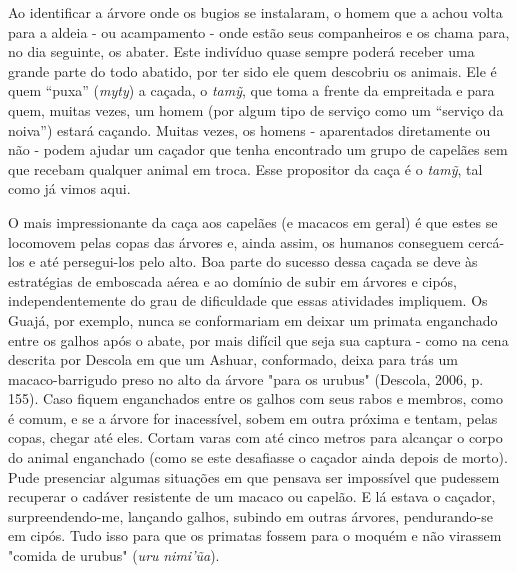 Ao identificar a árvore onde os bugios se instalaram, o homem que a
achou volta para a aldeia - ou acampamento - onde estão seus
companheiros e os chama para, no dia seguinte, os abater. Este indivíduo
quase sempre poderá receber uma grande parte do todo abatido, por ter
sido ele quem descobriu os animais. Ele é quem ``puxa'' (\emph{myty}) a
caçada, o \emph{tamỹ}, que toma a frente da empreitada e para quem,
muitas vezes, um homem (por algum tipo de serviço como um ``serviço da
noiva'') estará caçando. Muitas vezes, os homens - aparentados
diretamente ou não - podem ajudar um caçador que tenha encontrado um
grupo de capelães sem que recebam qualquer animal em troca. Esse
propositor da caça é o \emph{tamỹ}, tal como já vimos aqui.

O mais impressionante da caça aos capelães (e macacos em geral) é que
estes se locomovem pelas copas das árvores e, ainda assim, os humanos
conseguem cercá-los e até persegui-los pelo alto. Boa parte do sucesso
dessa caçada se deve às estratégias de emboscada aérea e ao domínio de
subir em árvores e cipós, independentemente do grau de dificuldade que
essas atividades impliquem. Os Guajá, por exemplo, nunca se conformariam
em deixar um primata enganchado entre os galhos após o abate, por mais
difícil que seja sua captura - como na cena descrita por Descola em que
um Ashuar, conformado, deixa para trás um macaco-barrigudo preso no alto
da árvore "para os urubus" (Descola, 2006, p. 155). Caso fiquem
enganchados entre os galhos com seus rabos e membros, como é comum, e se
a árvore for inacessível, sobem em outra próxima e tentam, pelas copas,
chegar até eles. Cortam varas com até cinco metros para alcançar o corpo
do animal enganchado (como se este desafiasse o caçador ainda depois de
morto). Pude presenciar algumas situações em que pensava ser impossível
que pudessem recuperar o cadáver resistente de um macaco ou capelão. E
lá estava o caçador, surpreendendo-me, lançando galhos, subindo em
outras árvores, pendurando-se em cipós. Tudo isso para que os primatas
fossem para o moquém e não virassem "comida de urubus" (\emph{uru}
\emph{nimi'ũa}).

